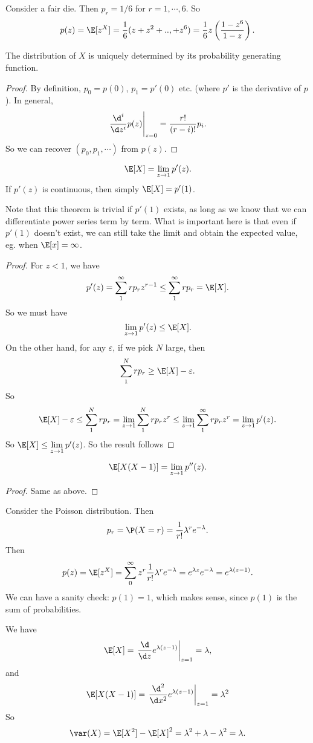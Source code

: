 \documentclass[a4paper]{article}
\begin{document}
\begin{eg}
  Consider a fair die. Then $p_r = 1/6$ for $r = 1, \cdots, 6$. So
  \[
    p(z) = \E[z^X] = \frac{1}{6}(z + z^2 + .., + z^6) = \frac{1}{6}z\left(\frac{1 - z^6}{1 - z}\right).
  \]
\end{eg}

\begin{thm}
  The distribution of $X$ is uniquely determined by its probability generating function.
\end{thm}

\begin{proof}
  By definition, $p_0 = p(0)$, $p_1 = p'(0)$ etc. (where $p'$ is the derivative of $p$). In general,
  \[
    \left. \frac{\d ^i}{\d z^i}p(z) \right|_{z = 0} = \frac{r!}{(r - i)!}p_i.
  \]
  So we can recover $(p_0, p_1, \cdots)$ from $p(z)$.
\end{proof}

\begin{thm}
  \[
    \E[X] = \lim_{z\to 1}p'(z).
  \]
  If $p'(z)$ is continuous, then simply $\E[X] = p'(1)$.
\end{thm}
Note that this theorem is trivial if $p'(1)$ exists, as long as we know that we can differentiate power series term by term. What is important here is that even if $p'(1)$ doesn't exist, we can still take the limit and obtain the expected value, eg. when $\E[x] = \infty$.

\begin{proof}
  For $z < 1$, we have
  \[
    p'(z) = \sum_1^\infty rp_r z^{r - 1} \leq \sum_1^\infty rp_r = \E[X].
  \]
  So we must have
  \[
    \lim_{z\to 1}p'(z) \leq \E[X].
  \]
  On the other hand, for any $\varepsilon$, if we pick $N$ large, then
  \[
    \sum_{1}^N rp_r \geq \E[X] - \varepsilon.
  \]
  So
  \[
    \E[X] - \varepsilon \leq \sum_1^N rp_r = \lim_{z\to 1}\sum _1^N rp_r z^r\leq \lim_{z \to 1} \sum_1^\infty rp_r z^r = \lim_{z\to 1} p' (z).
  \]
  So $\E[X] \leq \lim\limits_{z \to 1}p'(z)$. So the result follows
\end{proof}

\begin{thm}
  \[
    \E[X(X - 1)] = \lim_{z \to 1}p''(z).
  \]
\end{thm}
\begin{proof}
  Same as above.
\end{proof}

\begin{eg}
  Consider the Poisson distribution. Then
  \[
    p_r = \P(X = r) = \frac{1}{r!}\lambda^r e^{-\lambda}.
  \]
  Then
  \[
    p(z) = \E[z^X] = \sum_0^\infty z^r \frac{1}{r!}\lambda^r e^{-\lambda} = e^{\lambda z}e^{-\lambda} = e^{\lambda(z - 1)}.
  \]
  We can have a sanity check: $p(1) = 1$, which makes sense, since $p(1)$ is the sum of probabilities.

  We have
  \[
    \E[X]= \left.\frac{\d }{\d z}e^{\lambda(z - 1)}\right|_{z = 1} = \lambda,
  \]
  and
  \[
    \E[X(X - 1)] = \left.\frac{\d ^2}{\d x^2}e^{\lambda(z - 1)}\right|_{z = 1} = \lambda^2
  \]
  So
  \[
    \var(X) = \E[X^2] - \E[X]^2 = \lambda^2 + \lambda - \lambda^2 = \lambda.
  \]
\end{eg}
\end{document}
